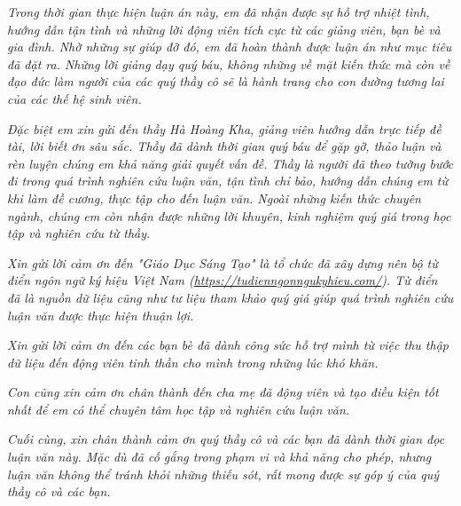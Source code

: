 

\newpage
{}
\thispagestyle{loi_cam_on}
\begin{center}
{}
\end{center}

\textit{Trong thời gian thực hiện luận án này, em đã nhận được sự hỗ trợ nhiệt tình, hướng dẫn tận tình và những lời động viên tích cực từ các giảng viên, bạn bè và gia đình. Nhờ những sự giúp đỡ đó, em đã hoàn thành được luận án như mục tiêu đã đặt ra. Những lời giảng dạy quý báu, không những về mặt kiến thức mà còn về đạo đức làm người của các quý thầy cô sẽ là hành trang cho con đường tương lai của các thế hệ sinh viên.}

\textit{Đặc biệt em xin gửi đến thầy Hà Hoàng Kha, giảng viên hướng dẫn trực tiếp đề tài, lời biết ơn sâu sắc. Thầy đã dành thời gian quý báu để gặp gỡ, thảo luận và rèn luyện chúng em khả năng giải quyết vấn đề. Thầy là người đã theo tường bước đi trong quá trình nghiên cứu luận văn, tận tình chỉ bảo, hướng dẫn chúng em từ khi làm đề cương, thực tập cho đến luận văn. Ngoài những kiến thức chuyên ngành, chúng em còn nhận được những lời khuyên, kinh nghiệm quý giá trong học tập và nghiên cứu từ thầy.}

\textit{Xin gửi lời cảm ơn đến "Giáo Dục Sáng Tạo" là tổ chức đã xây dựng nên bộ từ điển ngôn ngữ ký hiệu Việt Nam (\url{https://tudienngonngukyhieu.com/}). Từ điển đã là nguồn dữ liệu cũng như tư liệu tham khảo quý giá giúp quá trình nghiên cứu luận văn được thực hiện thuận lợi.}

\textit{Xin gửi lời cảm ơn đến các bạn bè đã dành công sức hỗ trợ mình từ việc thu thập dữ liệu đến động viên tinh thần cho mình trong những lúc khó khăn.}

\textit{Con cũng xin cảm ơn chân thành đến cha mẹ đã động viên và tạo điều kiện tốt nhất để em có thể chuyên tâm học tập và nghiên cứu luận văn.}

\textit{Cuối cùng, xin chân thành cảm ơn quý thầy cô và các bạn đã dành thời gian đọc luận văn này. Mặc dù đã cố gắng trong phạm vi và khả năng cho phép, nhưng luận văn không thể tránh khỏi những thiếu sót, rất mong được sự góp ý của quý thầy cô và các bạn.}



